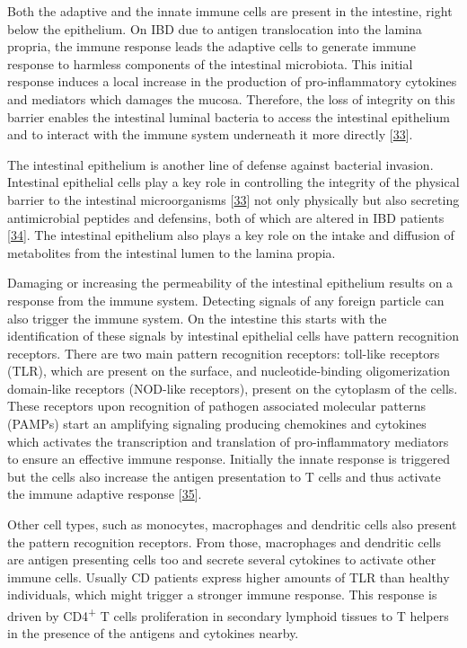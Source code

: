 \documentclass[
  a4paper,
]{book}
\begin{document}
Both the adaptive and the innate immune cells are present in the intestine, right below the epithelium.
On IBD due to antigen translocation into the lamina propria, the immune response leads the adaptive cells to generate immune response to harmless components of the intestinal microbiota.
This initial response induces a local increase in the production of pro-inflammatory cytokines and mediators which damages the mucosa.
Therefore, the loss of integrity on this barrier enables the intestinal luminal bacteria to access the intestinal epithelium and to interact with the immune system underneath it more directly {[}\protect\hyperlink{ref-hisamatsu2013}{33}{]}.

The intestinal epithelium is another line of defense against bacterial invasion.
Intestinal epithelial cells play a key role in controlling the integrity of the physical barrier to the intestinal microorganisms {[}\protect\hyperlink{ref-hisamatsu2013}{33}{]} not only physically but also secreting antimicrobial peptides and defensins, both of which are altered in IBD patients {[}\protect\hyperlink{ref-michielan2015}{34}{]}.
The intestinal epithelium also plays a key role on the intake and diffusion of metabolites from the intestinal lumen to the lamina propia.

Damaging or increasing the permeability of the intestinal epithelium results on a response from the immune system.
Detecting signals of any foreign particle can also trigger the immune system.
On the intestine this starts with the identification of these signals by intestinal epithelial cells have pattern recognition receptors.
There are two main pattern recognition receptors: toll-like receptors (TLR), which are present on the surface, and nucleotide-binding oligomerization domain-like receptors (NOD-like receptors), present on the cytoplasm of the cells.
These receptors upon recognition of pathogen associated molecular patterns (PAMPs) start an amplifying signaling producing chemokines and cytokines which activates the transcription and translation of pro-inflammatory mediators to ensure an effective immune response.
Initially the innate response is triggered but the cells also increase the antigen presentation to T cells and thus activate the immune adaptive response {[}\protect\hyperlink{ref-mayorgas2021a}{35}{]}.

Other cell types, such as monocytes, macrophages and dendritic cells also present the pattern recognition receptors.
From those, macrophages and dendritic cells are antigen presenting cells too and secrete several cytokines to activate other immune cells.
Usually CD patients express higher amounts of TLR than healthy individuals, which might trigger a stronger immune response.
This response is driven by CD4\textsuperscript{+} T cells proliferation in secondary lymphoid tissues to T helpers in the presence of the antigens and cytokines nearby.
\end{document}

